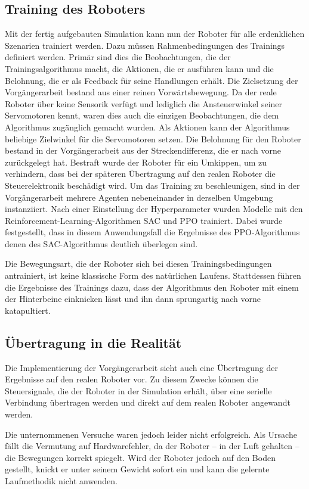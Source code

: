 \subsection{Training des Roboters}
Mit der fertig aufgebauten Simulation kann nun der Roboter für alle erdenklichen Szenarien trainiert werden.
Dazu müssen Rahmenbedingungen des Trainings definiert werden.
Primär sind dies die Beobachtungen, die der Trainingsalgorithmus macht, die Aktionen, die er ausführen kann und die Belohnung, die er als Feedback für seine Handlungen erhält.
Die Zielsetzung der Vorgängerarbeit bestand aus einer reinen Vorwärtsbewegung.
Da der reale Roboter über keine Sensorik verfügt und lediglich die Ansteuerwinkel seiner Servomotoren kennt, waren dies auch die einzigen Beobachtungen, die dem Algorithmus zugänglich gemacht wurden.
Als Aktionen kann der Algorithmus beliebige Zielwinkel für die Servomotoren setzen.
Die Belohnung für den Roboter bestand in der Vorgängerarbeit aus der Streckendifferenz, die er nach vorne zurückgelegt hat.
Bestraft wurde der Roboter für ein Umkippen, um zu verhindern, dass bei der späteren Übertragung auf den realen Roboter die Steuerelektronik beschädigt wird.
Um das Training zu beschleunigen, sind in der Vorgängerarbeit mehrere Agenten nebeneinander in derselben Umgebung instanziiert.
Nach einer Einstellung der Hyperparameter wurden Modelle mit den Reinforcement-Learning-Algorithmen SAC und PPO trainiert.
Dabei wurde festgestellt, dass in diesem Anwendungsfall die Ergebnisse des PPO-Algorithmus denen des SAC-Algorithmus deutlich überlegen sind.

Die Bewegungsart, die der Roboter sich bei diesen Trainingsbedingungen antrainiert, ist keine klassische Form des natürlichen Laufens.
Stattdessen führen die Ergebnisse des Trainings dazu, dass der Algorithmus den Roboter mit einem der Hinterbeine einknicken lässt und ihn dann sprungartig nach vorne katapultiert.

\subsection{Übertragung in die Realität}
Die Implementierung der Vorgängerarbeit sieht auch eine Übertragung der Ergebnisse auf den realen Roboter vor.
Zu diesem Zwecke können die Steuersignale, die der Roboter in der Simulation erhält, über eine serielle Verbindung übertragen werden und direkt auf dem realen Roboter angewandt werden.

Die unternommenen Versuche waren jedoch leider nicht erfolgreich.
Als Ursache fällt die Vermutung auf Hardwarefehler, da der Roboter -- in der Luft gehalten -- die Bewegungen korrekt spiegelt.
Wird der Roboter jedoch auf den Boden gestellt, knickt er unter seinem Gewicht sofort ein und kann die gelernte Laufmethodik nicht anwenden.


